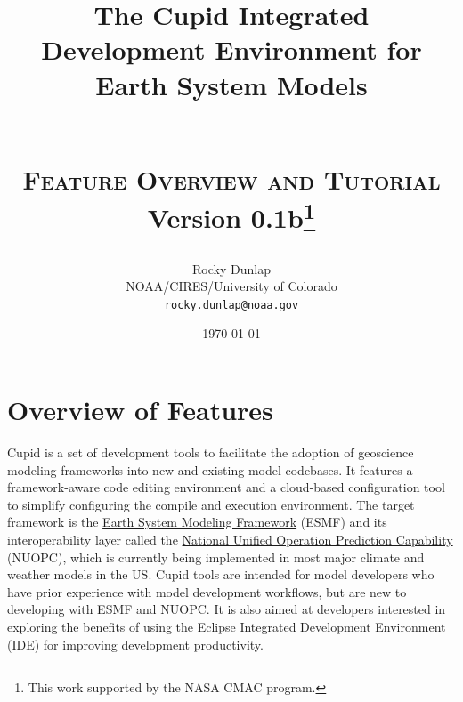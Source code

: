 \documentclass[oneside,11pt]{memoir}
\begin{document}
	\title{The Cupid Integrated Development Environment for Earth System Models
	
	\\ \vspace{20pt} \textsc{\textbf{Feature Overview and Tutorial}}
		\\Version 0.1b\thanks{This work supported by the NASA CMAC program.}}
			
	\author{Rocky Dunlap\\NOAA/CIRES/University of Colorado\\
		\texttt{rocky.dunlap@noaa.gov}}
	\date{\today}

\maketitle


\clearpage
\tableofcontents

\chapter{Overview of Features}

Cupid is a set of development tools to facilitate the adoption of geoscience modeling frameworks into new and existing model codebases.  It features a framework-aware code editing environment and a cloud-based configuration tool to simplify configuring the compile and execution environment.  The target framework is the \href{http://www.earthsystemmodeling.org/}{Earth System Modeling Framework} (ESMF) and its interoperability layer called the \href{https://earthsystemcog.org/projects/nuopc/}{National Unified Operation Prediction Capability} (NUOPC), which is currently being implemented in most major climate and weather models in the US. Cupid tools are intended for model developers who have prior experience with model development workflows, but are new to developing with ESMF and NUOPC.  It is also aimed at developers interested in exploring the benefits of using the Eclipse Integrated Development Environment (IDE) for improving development productivity.
\end{document}
